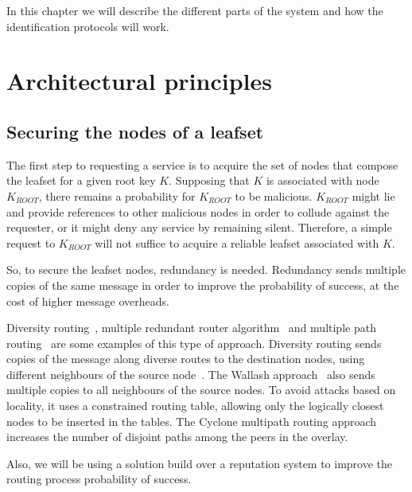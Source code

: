 
In this chapter we will describe the different parts of the system and how the
identification protocols will work.

\section{Architectural principles}

\subsection{Securing the nodes of a leafset}

The first step to requesting a service is to acquire the set of nodes that
compose the leafset for a given root key $K$. Supposing that $K$ is associated
with node $K_{ROOT}$, there remains a probability for $K_{ROOT}$ to be
malicious. $K_{ROOT}$ might lie and provide references to other malicious nodes
in order to collude against the requester, or it might deny any service by
remaining silent. Therefore, a simple request to $K_{ROOT}$ will not suffice to
acquire a reliable leafset associated with $K$.

So, to secure the leafset nodes, redundancy is needed. Redundancy sends multiple copies of
the same message in order to improve the probability of success, at the cost of
higher message overheads.

Diversity routing~\cite{castro2002secure}, multiple redundant router
algorithm~\cite{wallach2003survey} and
multiple path routing~\cite{artigas2005novel} are some examples of this type
of approach. Diversity routing sends copies of the message
along diverse routes to the destination nodes, using different
neighbours of the source node~\cite{castro2002secure}.
The Wallash approach~\cite{wallach2003survey}
also sends multiple copies to all neighbours of the source nodes.
To avoid attacks based on locality, it uses a constrained routing
table, allowing only the logically closest nodes to be inserted
in the tables. The Cyclone multipath routing approach~\cite{castro2002secure}
increases the number of disjoint paths among the peers in the
overlay.


Also, we will be using a solution build over a reputation system to improve the
routing process probability of success.

